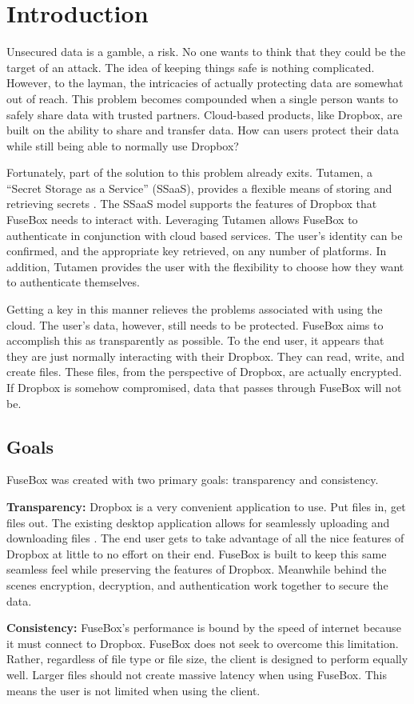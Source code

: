 \documentclass[11pt,twocolumn,letterpaper]{article}
\newcommand{\appname}{FuseBox }
\newcommand{\appnameWOspace}{FuseBox}
\newcommand{\custos}{Tutamen }
\newcommand{\custosWOspace}{Tutamen}
\begin{document}
\section{Introduction}
\label{sec:intro}
Unsecured data is a gamble, a risk. No one wants to think that
they could be the target of an attack. The idea of keeping things safe
is nothing complicated. However, to the layman, the intricacies of
actually protecting data are somewhat out of reach. This problem
becomes compounded when a single person wants to safely share data
with trusted partners. Cloud-based products, like Dropbox, are built
on the ability to share and transfer data. How can users protect their
data while still being able to normally use Dropbox? 
\par Fortunately, part of the solution to this problem already exits.
\custosWOspace, a ``Secret Storage as a Service'' (SSaaS), 
provides a flexible means of storing and
retrieving secrets \cite{exampleref1}. The SSaaS model supports the features of
Dropbox that \appname needs to interact with. Leveraging \custos allows \appname to 
authenticate in conjunction with cloud based services. The user's
identity can be confirmed, and the appropriate key retrieved, on any number
of platforms. In addition, \custos provides the user with the 
flexibility to choose how they want to authenticate themselves. 
\par Getting a key in this manner relieves the problems associated
with using the cloud. The user's data, however, still needs to be
protected. \appname aims to accomplish this as transparently as
possible. To the end user, it appears that they are just normally
interacting with their Dropbox. They can read, write, and create
files. These files, from the perspective of Dropbox, are actually
encrypted. If Dropbox is somehow compromised, data that passes through \appname
will not be.    

\subsection{Goals}
\label{sec:goals}
\appname was created with two primary goals: transparency and consistency. 
\par {\bf Transparency:} Dropbox is a very convenient application to
use. Put files in, get files out. The existing desktop application
allows for seamlessly uploading and downloading files \cite{exampleref1}. The end user
gets to take advantage of all the nice features of Dropbox at little
to no effort on their end. \appname is built to keep this same 
seamless feel while preserving the features of Dropbox. Meanwhile behind the
scenes encryption, decryption, and authentication work together to
secure the data.     
\par {\bf Consistency:} \appnameWOspace's performance is bound by
the speed of internet because it must connect to Dropbox. 
\appname does not seek to overcome this
limitation. Rather, regardless of file type or file size, the client
is designed to perform equally well. Larger files should not create
massive latency when using \appnameWOspace. This means the user is not
limited when using the client.    
\end{document}
